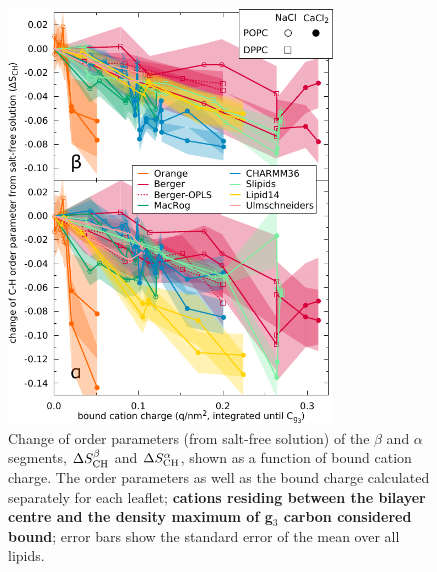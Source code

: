\documentclass[twoside,twocolumn,9pt]{article}
\begin{document}
\begin{figure}[t]
  \centering
  \includegraphics[width=8.6cm]{../scratch/boundIons/dOP_vs_boundCationCharge_Cg3.pdf}
  \caption{\label{electrometer_g3}
    Change of order parameters (from salt-free solution) of the $\beta$ and $\alpha$ segments,
    $\Delta S_{\rm{CH}}^{\beta}$ and $\Delta S_{\rm{CH}}^{\alpha}$,
    shown as a function of bound cation charge.
    The order parameters as well as the bound charge calculated separately for
    each leaflet; {\bf cations residing between the bilayer centre and the density maximum of g$_3$ carbon
    considered bound}; error bars show the standard error of the mean over all lipids.
   }
\end{figure}
\end{document}
